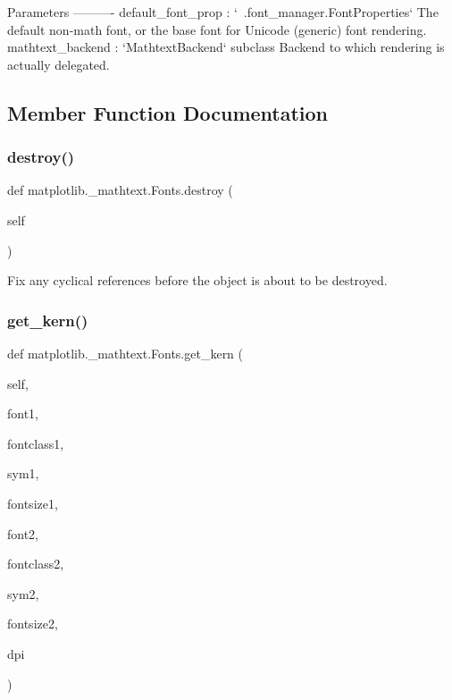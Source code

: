 \begin{DoxyVerb}Parameters
----------
default_font_prop : `~.font_manager.FontProperties`
    The default non-math font, or the base font for Unicode (generic)
    font rendering.
mathtext_backend : `MathtextBackend` subclass
    Backend to which rendering is actually delegated.
\end{DoxyVerb}
 

\subsection{Member Function Documentation}
\mbox{\label{classmatplotlib_1_1__mathtext_1_1Fonts_a7caf4da76a13d681f02ace7ed097445d}} 
\subsubsection{\texorpdfstring{destroy()}{destroy()}}
{\footnotesize\ttfamily def matplotlib.\+\_\+mathtext.\+Fonts.\+destroy (\begin{DoxyParamCaption}\item[{}]{self }\end{DoxyParamCaption})}

\begin{DoxyVerb}Fix any cyclical references before the object is about
to be destroyed.
\end{DoxyVerb}
 \mbox{\label{classmatplotlib_1_1__mathtext_1_1Fonts_a757f73592219d24858ad8f10f88cdd73}} 
\subsubsection{\texorpdfstring{get\+\_\+kern()}{get\_kern()}}
{\footnotesize\ttfamily def matplotlib.\+\_\+mathtext.\+Fonts.\+get\+\_\+kern (\begin{DoxyParamCaption}\item[{}]{self,  }\item[{}]{font1,  }\item[{}]{fontclass1,  }\item[{}]{sym1,  }\item[{}]{fontsize1,  }\item[{}]{font2,  }\item[{}]{fontclass2,  }\item[{}]{sym2,  }\item[{}]{fontsize2,  }\item[{}]{dpi }\end{DoxyParamCaption})}

